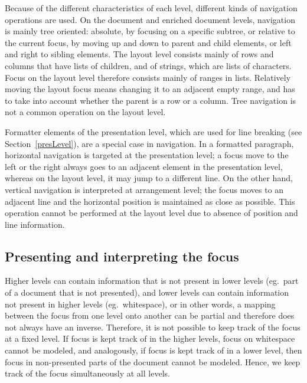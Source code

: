 Because of the different characteristics of each level, different kinds of navigation operations are used. On the document and enriched document levels, navigation is mainly tree oriented: absolute, by focusing on a specific subtree, or relative to the current focus, by moving up and down to parent and child elements, or left and right to sibling elements. The layout level consists mainly of rows and columns that have lists of children, and of strings, which are lists of characters. Focus on the layout level therefore consists mainly of ranges in lists. Relatively moving the layout focus means changing it to an adjacent empty range, and has to take into account whether the parent is a row or a column. Tree navigation is not a common operation on the layout level.


Formatter elements of the presentation level, which are used for line breaking (see Section~\ref{presLevel}), are a special case in navigation. In a formatted paragraph, horizontal navigation is targeted at the presentation level; a focus move to the left or the right always goes to an adjacent element in the presentation level, whereas on the layout level, it may jump to a different line. On the other hand, vertical navigation is interpreted at arrangement level; the focus moves to an adjacent line and the horizontal position is maintained as close as possible. This operation cannot be performed at the layout level due to absence of position and line information. 
 
 
%																
\subsection{Presenting and interpreting the focus}

Higher levels can contain information that is not present in lower levels (eg.\ part of a document that is not presented), and lower levels can contain information not present in higher levels (eg.\ whitespace), or in other words, a mapping between the focus from one level onto another can be partial and therefore does not always have an inverse. Therefore, it is not possible to keep track of the focus at a fixed level. If focus is kept track of in the higher levels, focus on whitespace cannot be modeled, and analogously, if focus is kept track of in a lower level, then focus in non-presented parts of the document cannot be modeled. Hence, we keep track of the focus simultaneously at all levels. 

